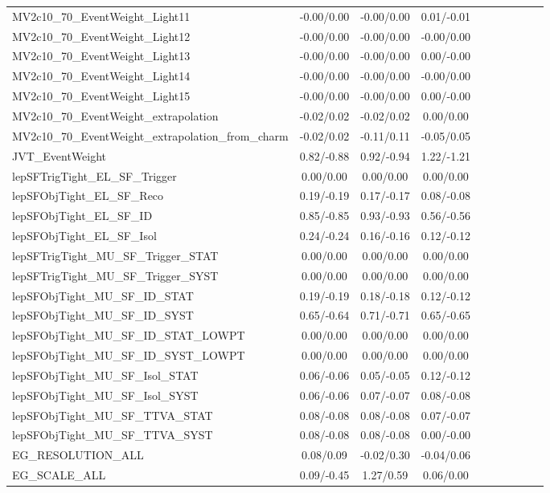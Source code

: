 \begin{table}[h]
\begin{center}
\begin{tabular}{l|ccccccccc}
MV2c10\_70\_EventWeight\_Light11 &-0.00/0.00 &-0.00/0.00 &0.01/-0.01 \\
MV2c10\_70\_EventWeight\_Light12 &-0.00/0.00 &-0.00/0.00 &-0.00/0.00 \\
MV2c10\_70\_EventWeight\_Light13 &-0.00/0.00 &-0.00/0.00 &0.00/-0.00 \\
MV2c10\_70\_EventWeight\_Light14 &-0.00/0.00 &-0.00/0.00 &-0.00/0.00 \\
MV2c10\_70\_EventWeight\_Light15 &-0.00/0.00 &-0.00/0.00 &0.00/-0.00 \\
MV2c10\_70\_EventWeight\_extrapolation &-0.02/0.02 &-0.02/0.02 &0.00/0.00 \\
MV2c10\_70\_EventWeight\_extrapolation\_from\_charm &-0.02/0.02 &-0.11/0.11 &-0.05/0.05 \\
JVT\_EventWeight &0.82/-0.88 &0.92/-0.94 &1.22/-1.21 \\
lepSFTrigTight\_EL\_SF\_Trigger &0.00/0.00 &0.00/0.00 &0.00/0.00 \\
lepSFObjTight\_EL\_SF\_Reco &0.19/-0.19 &0.17/-0.17 &0.08/-0.08 \\
lepSFObjTight\_EL\_SF\_ID &0.85/-0.85 &0.93/-0.93 &0.56/-0.56 \\
lepSFObjTight\_EL\_SF\_Isol &0.24/-0.24 &0.16/-0.16 &0.12/-0.12 \\
lepSFTrigTight\_MU\_SF\_Trigger\_STAT &0.00/0.00 &0.00/0.00 &0.00/0.00 \\
lepSFTrigTight\_MU\_SF\_Trigger\_SYST &0.00/0.00 &0.00/0.00 &0.00/0.00 \\
lepSFObjTight\_MU\_SF\_ID\_STAT &0.19/-0.19 &0.18/-0.18 &0.12/-0.12 \\
lepSFObjTight\_MU\_SF\_ID\_SYST &0.65/-0.64 &0.71/-0.71 &0.65/-0.65 \\
lepSFObjTight\_MU\_SF\_ID\_STAT\_LOWPT &0.00/0.00 &0.00/0.00 &0.00/0.00 \\
lepSFObjTight\_MU\_SF\_ID\_SYST\_LOWPT &0.00/0.00 &0.00/0.00 &0.00/0.00 \\
lepSFObjTight\_MU\_SF\_Isol\_STAT &0.06/-0.06 &0.05/-0.05 &0.12/-0.12 \\
lepSFObjTight\_MU\_SF\_Isol\_SYST &0.06/-0.06 &0.07/-0.07 &0.08/-0.08 \\
lepSFObjTight\_MU\_SF\_TTVA\_STAT &0.08/-0.08 &0.08/-0.08 &0.07/-0.07 \\
lepSFObjTight\_MU\_SF\_TTVA\_SYST &0.08/-0.08 &0.08/-0.08 &0.00/-0.00 \\
EG\_RESOLUTION\_ALL &0.08/0.09 &-0.02/0.30 &-0.04/0.06 \\
EG\_SCALE\_ALL &0.09/-0.45 &1.27/0.59 &0.06/0.00 \\

\end{tabular}
\end{center}
\end{table}
